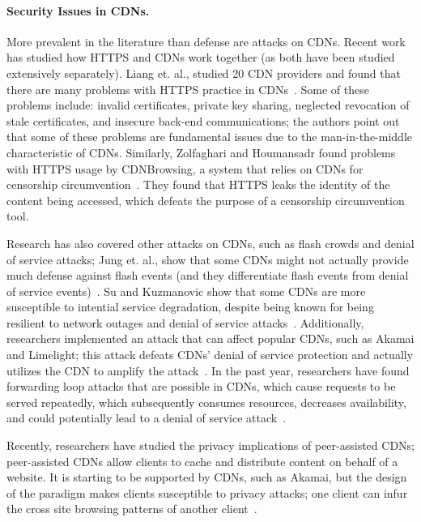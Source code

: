 \paragraph{Security Issues in CDNs.} More prevalent in the literature than defense are attacks on CDNs.  Recent work 
has studied how HTTPS and CDNs work together (as both have been studied extensively separately).  Liang et. al., studied 
20 CDN providers and found that there are many problems with HTTPS practice in CDNs~\cite{liang2014https}.  Some of these 
problems include: invalid certificates, private key sharing, neglected revocation of stale certificates, and 
insecure back-end communications; the authors point out that some of these problems are fundamental issues due to 
the man-in-the-middle characteristic of CDNs.  Similarly, Zolfaghari and Houmansadr found problems with HTTPS usage by 
CDNBrowsing, a system that relies on CDNs for censorship circumvention~\cite{zolfaghari2016practical}.  They found that HTTPS 
leaks the identity of the content being accessed, which defeats the purpose of a censorship circumvention tool. 

Research has also covered other attacks on CDNs, such as flash crowds and denial of service attacks; Jung et. al., show 
that some CDNs might not actually provide much defense against flash events (and they differentiate flash events from denial 
of service events)~\cite{jung2002flash}. Su and Kuzmanovic show that some CDNs are more susceptible to intential service 
degradation, despite being known for being resilient to network outages and denial of service attacks~\cite{su2008thinning}. 
Additionally, researchers implemented an attack that can affect popular CDNs, such as Akamai and Limelight; this attack 
defeats CDNs' denial of service protection and actually utilizes the CDN to amplify the attack~\cite{triukose2009content}.  In the 
past year, researchers have found forwarding loop attacks that are possible in CDNs, which cause requests to be served repeatedly, which 
subsequently consumes resources, decreases availability, and could potentially lead to a denial of service attack~\cite{chen2016forwarding}.

Recently, researchers have studied the privacy implications of peer-assisted CDNs; peer-assisted CDNs allow clients to cache and distribute 
content on behalf of a website.  It is starting to be supported by CDNs, such as Akamai, but the design of the paradigm
makes clients susceptible to privacy attacks; one client can infur the cross site browsing patterns of another client~\cite{jia2016anonymity}.\\


